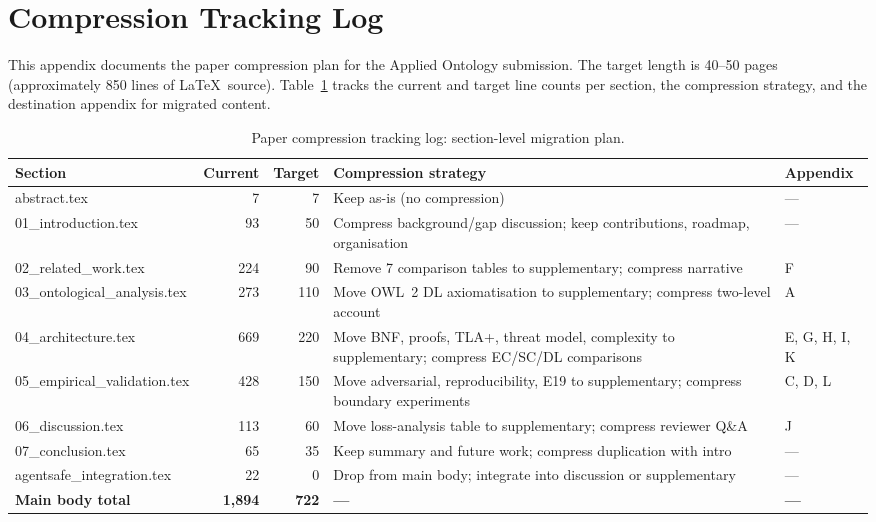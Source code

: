 \section{Compression Tracking Log}\label{app:compression-log}

This appendix documents the paper compression plan for the Applied Ontology submission. The target length is 40--50 pages (approximately 850 lines of \LaTeX\ source). Table~\ref{tab:compression-log} tracks the current and target line counts per section, the compression strategy, and the destination appendix for migrated content.

\begin{table}[htbp]
\centering
\small
\caption{Paper compression tracking log: section-level migration plan.}
\label{tab:compression-log}
\begin{tabular}{@{}lrrp{4.5cm}l@{}}
\toprule
\textbf{Section} & \textbf{Current} & \textbf{Target} & \textbf{Compression strategy} & \textbf{Appendix} \\
\midrule
abstract.tex & 7 & 7 & Keep as-is (no compression) & --- \\
01\_introduction.tex & 93 & 50 & Compress background/gap discussion; keep contributions, roadmap, organisation & --- \\
02\_related\_work.tex & 224 & 90 & Remove 7 comparison tables to supplementary; compress narrative & F \\
03\_ontological\_analysis.tex & 273 & 110 & Move OWL~2 DL axiomatisation to supplementary; compress two-level account & A \\
04\_architecture.tex & 669 & 220 & Move BNF, proofs, TLA+, threat model, complexity to supplementary; compress EC/SC/DL comparisons & E, G, H, I, K \\
05\_empirical\_validation.tex & 428 & 150 & Move adversarial, reproducibility, E19 to supplementary; compress boundary experiments & C, D, L \\
06\_discussion.tex & 113 & 60 & Move loss-analysis table to supplementary; compress reviewer Q\&A & J \\
07\_conclusion.tex & 65 & 35 & Keep summary and future work; compress duplication with intro & --- \\
agentsafe\_integration.tex & 22 & 0 & Drop from main body; integrate into discussion or supplementary & --- \\
\midrule
\textbf{Main body total} & \textbf{1,894} & \textbf{722} & \textbf{---} & \textbf{---} \\
\bottomrule
\end{tabular}
\end{table}

